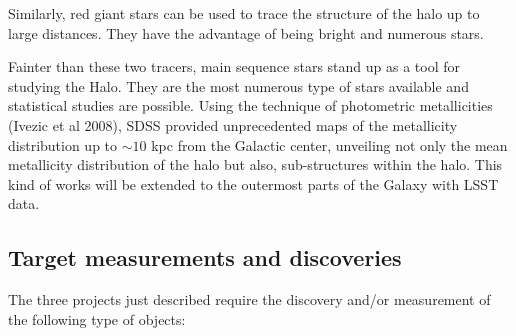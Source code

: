 Similarly, red giant stars can be used to trace the structure of the halo up to large
distances. They have the advantage 
of being bright and numerous stars. 

Fainter than these two tracers, main sequence stars stand up as a tool for studying
the Halo. They are the most numerous type of stars available and statistical studies 
are possible. Using the technique of photometric metallicities (Ivezic et al 2008), 
SDSS provided unprecedented maps of the metallicity distribution up to  $\sim 10$ 
kpc from the Galactic center, unveiling not only the mean metallicity distribution 
of the halo but also, sub-structures within the halo. This kind of works will be extended
to the outermost parts of the Galaxy with LSST data.



\subsection{Target measurements and discoveries}
\label{sec:\secname:MW_Halo_targets}

The three projects just described require the discovery and/or measurement of the following 
type of objects:

